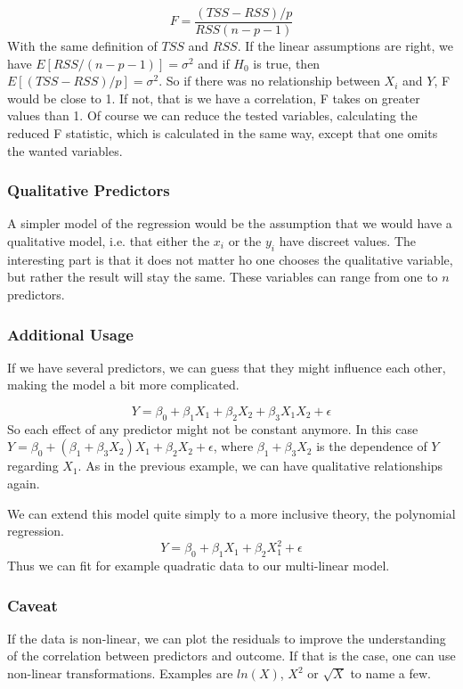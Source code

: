 \documentclass{article}
\begin{document}
$$F=\frac{(TSS-RSS)/p}{RSS(n-p-1)}$$
With the same definition of $TSS$ and $RSS$. If the linear assumptions are right, we have $E[RSS/(n-p-1)]=\sigma^2$ and if $H_0$ is true, then $E[(TSS-RSS)/p]=\sigma^2$. So if there was no relationship between $X_i$ and $Y$, F would be close to 1. If not, that is we have a correlation, F takes on greater values than 1. Of course we can reduce the tested variables, calculating the reduced F statistic, which is calculated in the same way, except that one omits the wanted variables.
\par


\subsubsection{Qualitative Predictors}

A simpler model of the regression would be the assumption that we would have a qualitative model, i.e. that either the $x_i$ or the $y_i$ have discreet values. The interesting part is that it does not matter ho one chooses the qualitative variable, but rather the result will stay the same. These variables can range from one to $n$ predictors. 

\subsubsection{Additional Usage}

If we have several predictors, we can guess that they might influence each other, making the model a bit more complicated. 

$$Y = \beta_0 + \beta_1X_1 + \beta_2X_2 + \beta_3 X_1X_2 + \epsilon$$
So each effect of any predictor might not be constant anymore. In this case 
$Y = \beta_0 + (\beta_1 + \beta_3X_2)X_1 + \beta_2X_2  + \epsilon$, where $\beta_1+\beta_3X_2$ is the dependence of $Y$ regarding $X_1$. As in the previous example, we can have qualitative relationships again. \par

We can extend this model quite simply to a more inclusive theory, the polynomial regression. 
$$Y = \beta_0 + \beta_1X_1 + \beta_2X_1^2  + \epsilon$$
Thus we can fit for example quadratic data to our multi-linear model.


\subsubsection{Caveat}

If the data is non-linear, we can plot the residuals to improve the understanding of the correlation between predictors and outcome. If that is the case, one can use non-linear transformations. Examples are $ln(X)$, $X^2$ or $\sqrt{X}$ to name a few.
\end{document}
